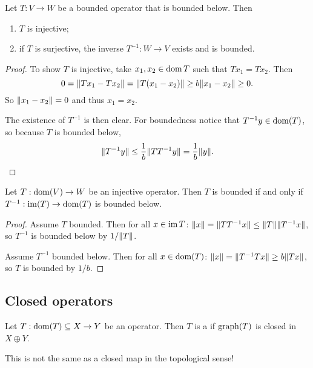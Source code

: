 \begin{proposition} \label{prop:boundedBelow}
Let $T:V\to W$ be a bounded operator that is bounded below. Then
\begin{enumerate}
\item $T$ is injective;
\item if $T$ is surjective, the inverse $T^{-1}: W\to V$ exists and is bounded.
\end{enumerate}
\end{proposition}
\begin{proof}
To show $T$ is injective, take $x_1,x_2\in \operatorname{dom} T$ such that $Tx_1 = Tx_2$. Then
\[ 0 = \lVert Tx_1 - Tx_2\rVert = \lVert T(x_1 - x_2)\rVert \geq b\lVert x_1 - x_2\rVert \geq 0. \]
So $\lVert x_1 - x_2\rVert = 0$ and thus $x_1=x_2$.

The existence of $T^{-1}$ is then clear. For boundedness notice that $T^{-1}y \in \operatorname{dom}(T)$, so because $T$ is bounded below,
\[ \lVert T^{-1}y\rVert \leq \frac{1}{b}\lVert TT^{-1}y\rVert = \frac{1}{b}\lVert y\rVert. \]
\end{proof}

\begin{lemma} \label{lemma:boundedBelowBounded}
Let $T:\operatorname{dom}(V)\to W$ be an injective operator. Then $T$ is bounded \textup{if and only if} $T^{-1}:\operatorname{im}(T)\to \operatorname{dom}(T)$ is bounded below.
\end{lemma}
\begin{proof}
Assume $T$ bounded. Then for all $x\in\operatorname{im} T$: $\lVert x\rVert = \lVert TT^{-1}x\rVert \leq \lVert T\rVert\lVert T^{-1}x\rVert$, so $T^{-1}$ is bounded below by $1/\lVert T\rVert$.

Assume $T^{-1}$ bounded below. Then for all $x\in\operatorname{dom}(T)$: $\lVert x\rVert = \lVert T^{-1}Tx\rVert \geq b\lVert Tx\rVert$, so $T$ is bounded by $1/b$.
\end{proof}

\subsection{Closed operators}
\begin{definition}
Let $T:\operatorname{dom}(T)\subseteq X\to Y$ be an operator. Then $T$ is a  if $\operatorname{graph}(T)$ is closed in $X\oplus Y$.
\end{definition}
This is not the same as a closed map in the topological sense!

